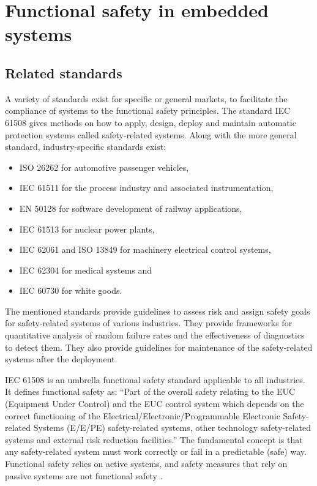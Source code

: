 \chapter{Functional safety in embedded systems} %
\label{functional_safety}

\section{Related standards}

A variety of standards exist for specific or general markets, to facilitate the compliance of systems to the functional safety principles. The standard IEC 61508 gives methods on how to apply, design, deploy and maintain automatic protection systems called safety-related systems.
Along with the more general standard, industry-specific standards exist:
\begin{itemize}

    \item ISO 26262 for automotive passenger vehicles,
    \item IEC 61511 for the process industry and associated instrumentation,
    \item EN 50128 for software development of railway applications,
    \item IEC 61513 for nuclear power plants,
    \item IEC 62061 and ISO 13849 for machinery electrical control systems,
    \item IEC 62304 for medical systems and
    \item IEC 60730 for white goods.

\end{itemize}

The mentioned standards provide guidelines to assess risk and assign safety goals for safety-related systems of various industries. They provide frameworks for quantitative analysis of random failure rates and the effectiveness of diagnostics to detect them. They also provide guidelines for maintenance of the safety-related systems after the deployment.

IEC 61508 is an umbrella functional safety standard applicable to all industries. It defines functional safety as: “Part of the overall safety relating to the EUC (Equipment Under Control) and the EUC control system which depends on the correct functioning of the Electrical/Electronic/Programmable Electronic Safety-related Systems (E/E/PE) safety-related systems, other technology safety-related systems and external risk reduction facilities.” The fundamental concept is that any safety-related system must work correctly or fail in a predictable (safe) way. Functional safety relies on active systems, and safety measures that rely on passive systems are not functional safety \citep{func_safety_explained}. 

